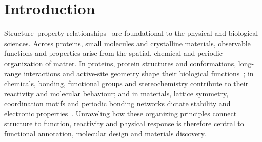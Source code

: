 
\section{Introduction}\label{sec1}
 
 
 
 

 
 
 
 
 
 

 
 
 
 
 

 
 
 
 


 
 
 
 
 
 
 






 

 

 

 

 

 

 

 
 

Structure--property relationships~\citep{thakur2026composition,le2012quantitative,van2008complete,creighton1993proteins,tai2022leveraging,osadchy2011maps} are foundational to the physical and biological sciences. Across proteins, small molecules and crystalline materials, observable functions and properties arise from the spatial, chemical and periodic organization of matter. 
In proteins, protein structures and conformations, long-range interactions and active-site geometry shape their biological functions~\citep{anfinsen1973principles,abramson2024accurate}; in chemicals, bonding, functional groups and stereochemistry contribute to their reactivity and molecular behaviour; and in materials, lattice symmetry, coordination motifs and periodic bonding networks dictate stability and electronic properties~\citep{xie2018crystal,merchant2023scaling}. 
Unraveling how these organizing principles connect structure to function, reactivity and physical response is therefore central to functional annotation, molecular design and materials discovery.


